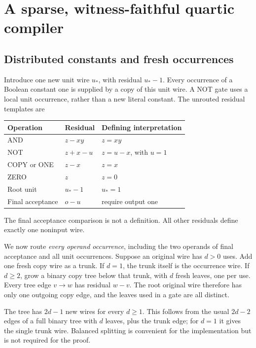 \documentclass[11pt,letterpaper]{article}
\numberwithin{equation}{section}
\theoremstyle{definition}
\theoremstyle{remark}
\newcommand{\srcmark}[1]{\par\noindent{\small\itshape [source~#1]}\par}
\begin{document}
\section{A sparse, witness-faithful quartic compiler}\label{pqc:ql:sec:compiler}
\srcmark{13}

\subsection{Distributed constants and fresh occurrences}
Introduce one new unit wire $u_*$, with residual $u_*-1$. Every occurrence of
a Boolean constant one is supplied by a copy of this unit wire. A NOT gate
uses a local unit occurrence, rather than a new literal constant. The
unrouted residual templates are
\begin{center}
\begin{tabular}{lll}
\toprule
Operation & Residual & Defining interpretation\\
\midrule
AND & $z-xy$ & $z=xy$\\
NOT & $z+x-u$ & $z=u-x$, with $u=1$\\
COPY or ONE & $z-x$ & $z=x$\\
ZERO & $z$ & $z=0$\\
Root unit & $u_*-1$ & $u_*=1$\\
Final acceptance & $o-u$ & require output one\\
\bottomrule
\end{tabular}
\end{center}
The final acceptance comparison is not a definition. All other residuals
define exactly one noninput wire.

We now route \emph{every operand occurrence}, including the two operands of
final acceptance and all unit occurrences. Suppose an original wire has
$d>0$ uses. Add one fresh copy wire as a trunk. If $d=1$, the trunk itself is
the occurrence wire. If $d\ge2$, grow a binary copy tree below that trunk,
with $d$ fresh leaves, one per use. Every tree edge $v\to w$ has residual
$w-v$. The root original wire therefore has only one outgoing copy edge,
and the leaves used in a gate are all distinct.

The tree has $2d-1$ new wires for every $d\ge1$. This follows from the usual
$2d-2$ edges of a full binary tree with $d$ leaves, plus the trunk edge;
for $d=1$ it gives the single trunk wire. Balanced splitting is convenient
for the implementation but is not required for the proof.
\end{document}
